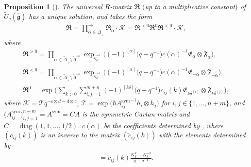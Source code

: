 \documentclass[pdftex]{sigma}
\numberwithin{equation}{section}
\newtheorem{Proposition}[Theorem]{Proposition}
 { \theoremstyle{definition}
\newtheorem{Definition}[Theorem]{Definition}
\newtheorem{Note}[Theorem]{Note}
\newtheorem{Example}[Theorem]{Example}
\newtheorem{Remark}[Theorem]{Remark} }
\begin{document}
\begin{Proposition}[{\cite[Theorem 4.1]{SMVN}}]\label{URD}
The universal $R$-matrix $\mathfrak{R}$ $($up to a multiplicative con\-stant$)$ of $\widetilde{U}_q(\mathfrak{\hat{g}})$ has a unique solution, and takes the form
\begin{gather*}
 \mathfrak{R}=\prod\limits_{\alpha\in\widetilde{\underline{\Delta}}_+ }^{\rightarrow}\mathfrak{R}_{\alpha}\cdot \mathcal{K}=\mathfrak{R}^{>0}\mathfrak{R}^{0}\mathfrak{R}^{<0}\cdot \mathcal{K},
\end{gather*}
where
\begin{gather*}
 \mathfrak{R}^{>0}=\prod\limits_{\alpha\in\widetilde{\underline{\Delta}}_+\setminus\widetilde{\Delta}^{\text{im}} }\exp_{\hat{q}_{\alpha}^{-1}}\bigl((-1)^{[\alpha]}\bigl(q-q^{-1}\bigr)c(\alpha)^{-1}\mathfrak{E}_{\alpha}\otimes \mathfrak{F}_{\alpha}\bigr), \\
 \mathfrak{R}^{<0}=\prod\limits_{\alpha\in\widetilde{\underline{\Delta}}_+\setminus\widetilde{\Delta}^{\text{im}} }\exp_{\hat{q}_{\alpha}^{-1}}\bigl((-1)^{[\alpha]}\bigl(q-q^{-1}\bigr)c(\alpha)^{-1}\mathfrak{E}_{-\alpha}\otimes \mathfrak{F}_{-\alpha}\bigr),\\
 \mathfrak{R}^{0}=\exp\Biggl(\sum\limits_{k>0}\sum\limits_{i,j=1}^{m+n}(-1)^{[k\delta]}\bigl(q-q^{-1}\bigr)c_{ij}(k)\mathfrak{E}_{k\delta^{(i)}}\otimes \mathfrak{F}_{k\delta^{(j)}}\Biggr),
\end{gather*}
where $\mathcal{K}=\mathcal{T}q^{-c\otimes d-d\otimes c}$, $\mathcal{T}=\exp\bigl(\hbar {A_{ij}^{\operatorname{sym}}}^{-1}h_i\otimes h_j\bigr)$ for $i,j\in\{1,\dots,n+m\}$, and $\bigl(A_{ij}^{\operatorname{sym}}\bigr)_{i,j=1}^{n+m}=A^{\operatorname{sym}}=CA$ is the symmetric Cartan matrix and $C=\operatorname{diag}(1, 1,\dots,1/2)$.
 $c(\alpha)$ be the coefficients determined by , where
$(c_{ij}(k))$ is an inverse to the matrix $(\tilde{c}_{ij}(k))$ with the elements determined by
\begin{gather*}
[\mathfrak{E}_{k\delta^{(i)}}, \mathfrak{F}_{k\delta^{(j)}}]=\tilde{c}_{ij}(k)\frac{K_{\delta}^k-K_{\delta}^{-k}}{q-q^{-1}}.
\end{gather*}
\end{Proposition}
\end{document}
